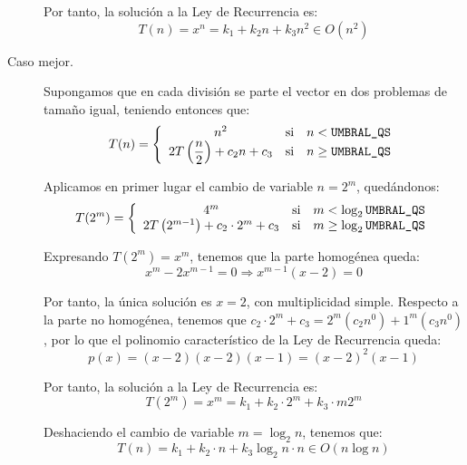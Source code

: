 \documentclass[12pt]{article}
\begin{document}
\begin{description}
        Por tanto, la solución a la Ley de Recurrencia es:
        \begin{equation*}
            T(n)=x^n = k_1 + k_2n + k_3n^2 \in O(n^2)
        \end{equation*}

        \item[Caso mejor.] Supongamos que en cada división se parte el vector en dos problemas de tamaño igual, teniendo entonces que:
        \begin{equation*}
            T(n) = \left\{
            \begin{array}{ccc}
                n^2 & \text{si} & n< \verb|UMBRAL_QS|\\
                2T\left(\dfrac{n}{2}\right) + c_2n +c_3 & \text{si} & n\geq \verb|UMBRAL_QS|
            \end{array}
            \right.
        \end{equation*}

        Aplicamos en primer lugar el cambio de variable $n=2^m$, quedándonos:
        \begin{equation*}
            T(2^m) = \left\{
            \begin{array}{ccc}
                4^m & \text{si} & m< \log_2\verb|UMBRAL_QS|\\
                2T\left(2^{m-1}\right) + c_2\cdot 2^m +c_3 & \text{si} & m\geq \log_2 \verb|UMBRAL_QS|
            \end{array}
            \right.
        \end{equation*}

        Expresando $T(2^m)=x^m$, tenemos que la parte homogénea queda:
        \begin{equation*}
            x^m - 2x^{m-1} = 0 \Longrightarrow
            x^{m-1}(x-2)=0
        \end{equation*}

        Por tanto, la única solución es $x=2$, con multiplicidad simple. Respecto a la parte no homogénea, tenemos que $c_2\cdot 2^m+c_3=2^m (c_2n^0)+1^m(c_3n^0)$, por lo que el polinomio característico de la Ley de Recurrencia queda:
        \begin{equation*}
            p(x)=(x-2)(x-2)(x-1) = (x-2)^2(x-1)
        \end{equation*}

        Por tanto, la solución a la Ley de Recurrencia es:
        \begin{equation*}
            T(2^m)=x^m = k_1 + k_2\cdot 2^m + k_3\cdot m2^m
        \end{equation*}

        Deshaciendo el cambio de variable $m=\log_2 n$, tenemos que:
        \begin{equation*}
            T(n)=k_1 + k_2\cdot n + k_3 \log_2n \cdot n
            \in O(n\log n)
        \end{equation*}
    \end{description}
\end{document}
